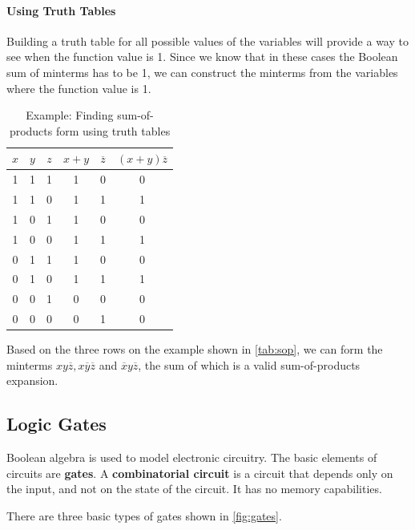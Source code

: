 		\paragraph{Using Truth Tables}
Building a truth table for all possible values of the variables will provide a way to see when the function value is 1. Since we know that in these cases the Boolean sum of minterms has to be 1, we can construct the minterms from the variables where the function value is 1.
\begin{table}[H]
	\centering
	\begin{tabular}{cccccc}
	\toprule
	\( x \)  & \( y \)  & \( z \)  &\(  x+y \)  & \( \overline{z} \)  & \( (x+y)\overline{z} \)  \\ \midrule
	1 & 1 & 1 & 1 & 0 & 0 \\
	1 & 1 & 0 & 1 & 1 & 1 \\
	1 & 0 & 1 & 1 & 0 & 0 \\
	1 & 0 & 0 & 1 & 1 & 1 \\
	0 & 1 & 1 & 1 & 0 & 0 \\
	0 & 1 & 0 & 1 & 1 & 1 \\
	0 & 0 & 1 & 0 & 0 & 0 \\
	0 & 0 & 0 & 0 & 1 & 0 \\ \bottomrule
	\end{tabular}
	\caption{Example: Finding sum-of-products form using truth tables}
	\label{tab:sop}
	\end{table}

	Based on the three rows on the example shown in \autoref{tab:sop}, we can form the minterms \( xy\overline{z},  x\overline{y}\overline{z}\) and \( \overline{x}y\overline{z} \), the sum of which is a valid sum-of-products expansion.

\subsection{Logic Gates}

Boolean algebra is used to model electronic circuitry. The basic elements of circuits are \textbf{gates}. A \textbf{combinatorial circuit} is a circuit that depends only on the input, and not on the state of the circuit. It has no memory capabilities.

There are three basic types of gates shown in \autoref{fig:gates}.

